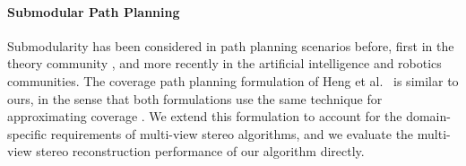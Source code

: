 \paragraph{Submodular Path Planning}
Submodularity \cite{krause:2014} has been considered in path planning scenarios before, first in the theory community \cite{chekuri:2012,chekuri:2005}, and more recently in the artificial intelligence \cite{singh:2009a,singh:2009b,zhang:2016} and robotics \cite{heng:2015,hollinger:2013} communities.
The coverage path planning formulation of Heng et al.~\cite{heng:2015} is similar to ours, in the sense that both formulations use the same technique for approximating coverage \cite{iyer:2013b,iyer:2013a}.
We extend this formulation to account for the domain-specific requirements of multi-view stereo algorithms, and we evaluate the multi-view stereo reconstruction performance of our algorithm directly.
